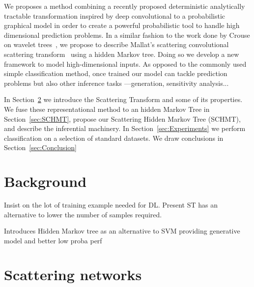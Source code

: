 \documentclass{article}
\begin{document}
  We proposes a method combining a recently proposed deterministic analytically tractable transformation inspired by deep convolutional to a probabilistic graphical model in order to create a powerful probabilistic tool to handle high dimensional prediction problems. In a similar fashion to the work done by Crouse on wavelet trees~\citep{crouse1998wavelet}, we propose to describe Mallat's scattering convolutional scattering transform~\citep{bruna2010classification} using a hidden Markov tree. Doing so we develop a new framework to model high-dimensional inputs. As opposed to the commonly used simple classification method, once trained our model can tackle prediction problems but also other inference tasks ---\eg generation, sensitivity analysis... %

  In Section~\ref{sec:SCN} we introduce the Scattering Transform and some of its properties. We  fuse these representational method to an hidden Markov Tree in Section~\ref{sec:SCHMT}, propose our Scattering Hidden Markov Tree (SCHMT), and describe the inferential machinery. In Section~\ref{sec:Experiments} we perform classification on a selection of standard datasets. We draw conclusions in Section~\ref{sec:Conclusion}
  
\section{Background}
  \label{sec:Background}
  Insist on the lot of training example needed for DL. Present ST has an alternative to lower the number of samples required.
  
  Introduces Hidden Markov tree as an alternative to SVM providing generative model and better low proba perf


\section{Scattering networks}
  \label{sec:SCN}

\end{document}
